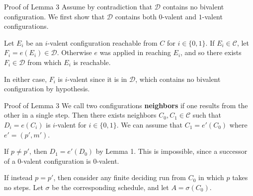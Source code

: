 \documentclass[12pt]{beamer}
\begin{document}
  \begin{frame}{Proof of Lemma 3}
    Assume by contradiction that \(\mathcal{D}\) contains no bivalent
    configuration. We first show that \(\mathcal{D}\) contains both
    \(0\)-valent and \(1\)-valent configurations.

    \pause\vspace{0.25cm}

    Let \(E_i\) be an \(i\)-valent configuration reachable from \(C\) for
    \(i\in\{0,1\}\). If \(E_i\in \mathcal{C}\), let \(F_i = e(E_i) \in
    \mathcal{D}\). Otherwise \(e\) was applied in reaching \(E_i\), and so
    there exists \(F_i \in \mathcal{D}\) from which \(E_i\) is reachable.

    \pause\vspace{0.25cm}

    In either case, \(F_i\) is \(i\)-valent since it is in \(\mathcal{D}\),
    which contains no bivalent configuration by hypothesis.
  \end{frame}

  \begin{frame}{Proof of Lemma 3}
    We call two configurations \textbf{neighbors} if one results from the other
    in a single step. Then there exists neighbors \(C_0, C_1\in\mathcal{C}\)
    such that \(D_i = e(C_i)\) is \(i\)-valent for \(i\in\{0,1\}\). We can
    assume that \(C_1 = e'(C_0)\) where \(e' = (p', m')\).

    \pause\vspace{0.25cm}

    If \(p \neq p'\), then \(D_1 = e'(D_0)\) by Lemma 1. This is impossible,
    since a successor of a \(0\)-valent configuration is \(0\)-valent.

    \pause\vspace{0.25cm}

    If instead \(p = p'\), then consider any finite deciding run from \(C_0\)
    in which \(p\) takes no steps. Let \(\sigma\) be the corresponding
    schedule, and let \(A = \sigma(C_0)\).
  \end{frame}
\end{document}

